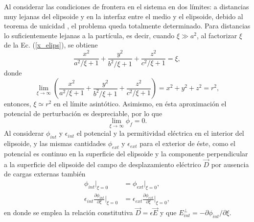 Al considerar las condiciones de frontera en el sistema en dos límites: a distancias muy lejanas del elipsoide y en la interfaz entre el medio y el elipsoide, debido al teorema de unicidad \cite{Griffiths}, el problema queda totalmente determinado. Para distancias lo suficientemente lejanas a la partícula, es decir, cuando $\xi\gg a^2$, al factorizar $\xi$ de  la Ec. (\ref{x_elips}), se obtiene
\begin{equation*}
    \frac{x^2}{a^2/\xi+1}+\frac{y^2}{b^2/\xi+1}+\frac{z^2}{c^2/\xi+1}=\xi,
\end{equation*}
donde
\begin{equation*}
    \lim_{\xi\rightarrow\infty}\left(\frac{x^2}{a^2/\xi+1}+\frac{y^2}{b^2/\xi+1}+\frac{z^2}{c^2/\xi+1}\right)=x^2+y^2+z^2=r^2,
\end{equation*}
entonces, $\xi \simeq r^2$ en el límite asintótico. Asimismo, en ésta aproximación el potencial de perturbación es despreciable, por lo que 
\begin{equation}
\lim_{\xi\rightarrow\infty}\phi_f=0
\label{limitephi_p}.
\end{equation}
Al considerar $\phi_{int}$ y $\epsilon_{int}$ el potencial y la permitividad eléctrica en el interior del elipsoide, y las mismas cantidades $\phi_{ext}$ y $\epsilon_{ext}$ para el exterior de éste, como el potencial es continuo en la superficie del elipsoide y la componente perpendicular a la superficie del elipsoide del campo de desplazamiento eléctrico $\Vec{D}$ por ausencia de cargas externas también \cite{Griffiths}
\begin{subequations}
\label{condicionesfrontera}
\begin{align}
    \phi_{int}|_{\xi=0}&=\phi_{ext}|_{\xi=0}\label{cf1},\\
    \epsilon_{int}\frac{\partial \phi_{int}}{\partial \xi}\Big |_{\xi=0}&=
    \epsilon_{ext}\frac{\partial \phi_{ext}}{\partial \xi}\Big |_{\xi=0}\label{cf2},
\end{align}
\end{subequations}
en donde se emplea la relación constitutiva $\Vec{D}=\epsilon\Vec{E}$ y que $E_{int}^{\perp}=-\partial \phi_{int} /\partial \xi$.\\


